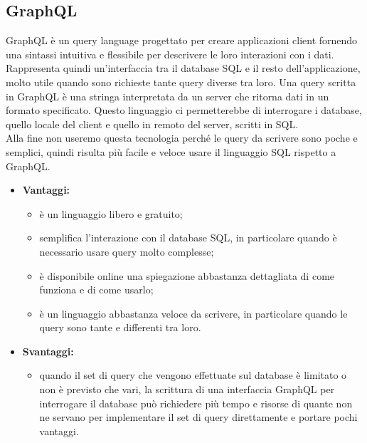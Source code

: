 \subsection{GraphQL} 
	GraphQL è un query language progettato per creare applicazioni client fornendo una sintassi intuitiva e flessibile per descrivere le loro interazioni con i dati. Rappresenta quindi un'interfaccia tra il database SQL e il resto dell'applicazione, molto utile quando sono richieste tante query diverse tra loro.
	Una query scritta in GraphQL è una stringa interpretata da un server che ritorna dati in un formato specificato. 
	Questo linguaggio ci permetterebbe di interrogare i database, quello locale del client e quello in remoto del server, scritti in SQL. \\
	Alla fine non useremo questa tecnologia perché le query da scrivere sono poche e semplici, quindi risulta più facile e veloce usare il linguaggio SQL rispetto a GraphQL. %
	
	\begin{itemize}
		\item \textbf{Vantaggi:}
			\begin{itemize}
				\item è un linguaggio libero e gratuito;
				\item semplifica l'interazione con il database SQL, in particolare quando è necessario usare query molto complesse;
				\item è disponibile online una spiegazione abbastanza dettagliata di come funziona e di come usarlo;
				\item è un linguaggio abbastanza veloce da scrivere, in particolare quando le query sono tante e differenti tra loro.
			\end{itemize}
		\item \textbf{Svantaggi:}
			\begin{itemize}
				\item quando il set di query che vengono effettuate sul database è limitato o non è previsto che vari, la scrittura di una interfaccia GraphQL per interrogare il database può richiedere più tempo e risorse di quante non ne servano per implementare il set di query direttamente e portare pochi vantaggi.
			\end{itemize}
	\end{itemize}

